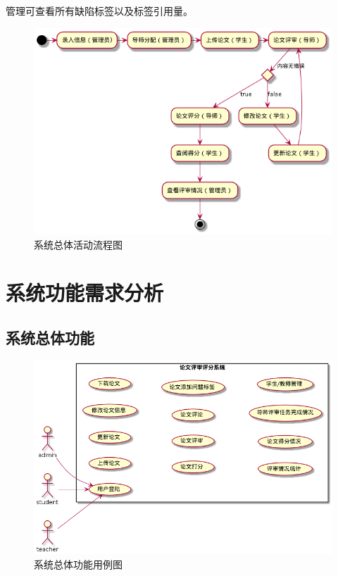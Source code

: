 管理可查看所有缺陷标签以及标签引用量。
\begin{figure}[h]
	\centering
	\includegraphics[scale = 0.6]{out/uml/流程图/系统总体活动流程图/系统总体活动流程图.png}
	\caption{\song\wuhao 系统总体活动流程图}
\end{figure}


\section{系统功能需求分析}

\subsection{系统总体功能}

\begin{figure}[h]
	\centering
	\includegraphics[scale = 0.6]{out/uml/用例图/系统总体功能用例图/系统总体功能用例图.png}
	\caption{\song\wuhao 系统总体功能用例图}
\end{figure}

